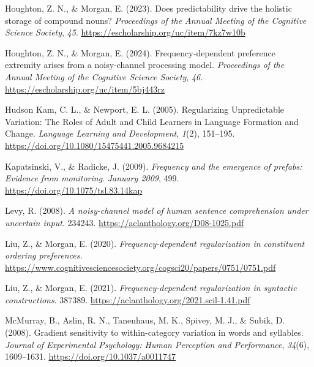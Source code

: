 \documentclass[
  12pt,
]{scrartcl}
\newlength{\cslhangindent}
\newenvironment{CSLReferences}[2] %
 {\begin{list}{}{%
  \setlength{\itemindent}{0pt}
  \setlength{\leftmargin}{0pt}
  \setlength{\parsep}{0pt}
  \ifodd #1
   \setlength{\leftmargin}{\cslhangindent}
   \setlength{\itemindent}{-1\cslhangindent}
  \fi
  \setlength{\itemsep}{#2\baselineskip}}}
 {\end{list}}
\begin{document}
\begin{CSLReferences}{1}{0}
Houghton, Z. N., \& Morgan, E. (2023). Does predictability drive the
holistic storage of compound nouns? \emph{Proceedings of the Annual
Meeting of the Cognitive Science Society}, \emph{45}.
\url{https://escholarship.org/uc/item/7kz7w10b}

Houghton, Z. N., \& Morgan, E. (2024). Frequency-dependent preference
extremity arises from a noisy-channel processing model.
\emph{Proceedings of the Annual Meeting of the Cognitive Science
Society}, \emph{46}. \url{https://escholarship.org/uc/item/5bj443rz}

Hudson Kam, C. L., \& Newport, E. L. (2005). Regularizing Unpredictable
Variation: The Roles of Adult and Child Learners in Language Formation
and Change. \emph{Language Learning and Development}, \emph{1}(2),
151--195. \url{https://doi.org/10.1080/15475441.2005.9684215}

Kapatsinski, V., \& Radicke, J. (2009). \emph{Frequency and the
emergence of prefabs: Evidence from monitoring}. \emph{January 2009},
499. \url{https://doi.org/10.1075/tsl.83.14kap}

Levy, R. (2008). \emph{A noisy-channel model of human sentence
comprehension under uncertain input}. 234243.
\url{https://aclanthology.org/D08-1025.pdf}

Liu, Z., \& Morgan, E. (2020). \emph{Frequency-dependent regularization
in constituent ordering preferences.}
\url{https://www.cognitivesciencesociety.org/cogsci20/papers/0751/0751.pdf}

Liu, Z., \& Morgan, E. (2021). \emph{Frequency-dependent regularization
in syntactic constructions}. 387389.
\url{https://aclanthology.org/2021.scil-1.41.pdf}

McMurray, B., Aslin, R. N., Tanenhaus, M. K., Spivey, M. J., \& Subik,
D. (2008). Gradient sensitivity to within-category variation in words
and syllables. \emph{Journal of Experimental Psychology: Human
Perception and Performance}, \emph{34}(6), 1609--1631.
\url{https://doi.org/10.1037/a0011747}


\end{CSLReferences}
\end{document}
